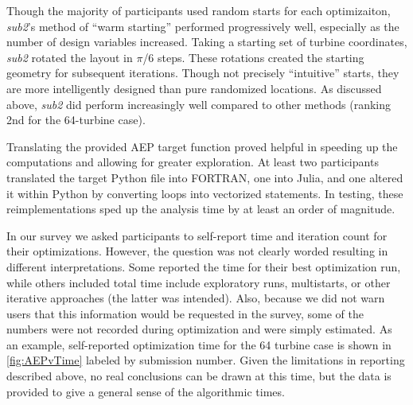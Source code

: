 	Though the majority of participants used random starts for each optimizaiton, \textit{sub2}'s method of ``warm starting'' performed progressively well, especially as the number of design variables increased.
	Taking a starting set of turbine coordinates, \textit{sub2} rotated the layout in $\pi$/6 steps.
	These rotations created the starting geometry for subsequent iterations.
	Though not precisely ``intuitive'' starts, they are more intelligently designed than pure randomized locations.
	As discussed above, \textit{sub2} did perform increasingly well compared to other methods (ranking 2nd for the 64-turbine case).
	
	Translating the provided AEP target function proved helpful in speeding up the computations and allowing for greater exploration.
	At least two participants translated the target Python file into FORTRAN, one into Julia, and one altered it within Python by converting loops into vectorized statements.
	In testing, these reimplementations sped up the analysis time by at least an order of magnitude. 
	
	In our survey we asked participants to self-report time and iteration count for their optimizations.  However, the question was not clearly worded resulting in different interpretations.  Some reported the time for their best optimization run, while others included total time include exploratory runs, multistarts, or other iterative approaches (the latter was intended).  Also, because we did not warn users that this information would be requested in the survey, some of the numbers were not recorded during optimization and were simply estimated.  As an example, self-reported optimization time for the 64 turbine case is shown in \cref{fig:AEPvTime} labeled by submission number.  Given the limitations in reporting described above, no real conclusions can be drawn at this time, but the data is provided to give a general sense of the algorithmic times.
	